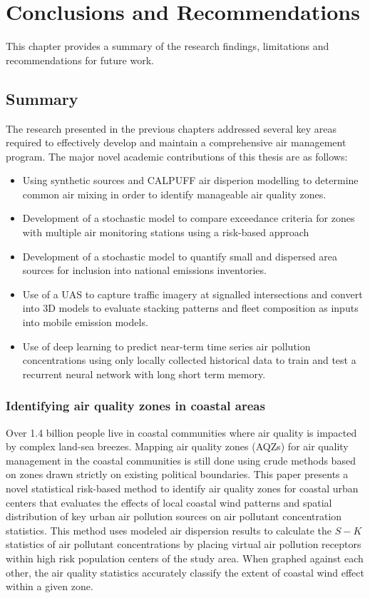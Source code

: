 \chapter{Conclusions and Recommendations}
This chapter provides a summary of the research findings, limitations  and recommendations for future work.

\section{Summary}

The research presented in the previous chapters addressed several key areas required to effectively develop and maintain a comprehensive air management program. The major novel academic contributions of this thesis are as follows:

\begin{itemize}
\item {Using synthetic sources and CALPUFF air disperion modelling to determine common air mixing in order to identify manageable air quality zones.}
\item {Development of a stochastic model to compare exceedance criteria for zones with multiple air monitoring stations using a risk-based approach}
\item{Development of a stochastic model to quantify small and dispersed area sources for inclusion into national emissions inventories.}
\item{Use of a UAS to capture traffic imagery at signalled intersections and convert into 3D models to evaluate stacking patterns and fleet composition as inputs into mobile emission models}.
\item{Use of deep learning to predict near-term time series air pollution concentrations using only locally collected historical data to train and test a recurrent neural network with long short term memory.}
\end{itemize}

\subsection{Identifying air quality zones in coastal areas}

Over 1.4 billion people live in coastal communities where air quality is impacted by complex land-sea breezes.  Mapping air quality zones (AQZs) for air quality management in the coastal communities is still done using crude methods based on zones drawn strictly on existing political boundaries. This paper presents a novel statistical risk-based method to identify air quality zones for coastal urban centers that evaluates the effects of local coastal wind patterns and spatial distribution of key urban air pollution sources on air pollutant concentration statistics.  This method uses modeled air dispersion results to calculate the $S-K$ statistics of air pollutant concentrations by placing virtual air pollution receptors within high risk population centers of the study area.  When graphed against each other, the air quality statistics accurately classify the extent of coastal wind effect within a given zone.
 
